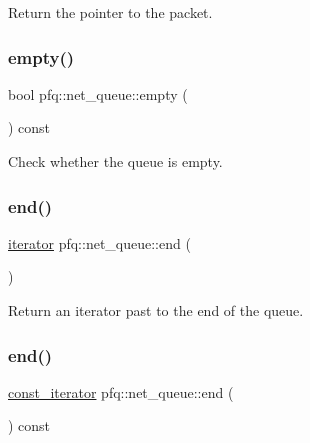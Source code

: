 Return the pointer to the packet. 

\mbox{\label{classpfq_1_1net__queue_a3fa7bba9db8d43916404868573676d25}} 
\subsubsection{\texorpdfstring{empty()}{empty()}}
{\footnotesize\ttfamily bool pfq\+::net\+\_\+queue\+::empty (\begin{DoxyParamCaption}{ }\end{DoxyParamCaption}) const\hspace{0.3cm}{\ttfamily [inline]}}



Check whether the queue is empty. 

\mbox{\label{classpfq_1_1net__queue_acef930aef921f06803621af79f993b25}} 
\subsubsection{\texorpdfstring{end()}{end()}\hspace{0.1cm}{\footnotesize\ttfamily [1/2]}}
{\footnotesize\ttfamily \hyperlink{structpfq_1_1net__queue_1_1iterator}{iterator} pfq\+::net\+\_\+queue\+::end (\begin{DoxyParamCaption}{ }\end{DoxyParamCaption})\hspace{0.3cm}{\ttfamily [inline]}}



Return an iterator past to the end of the queue. 

\mbox{\label{classpfq_1_1net__queue_ad563083d60d2b1b581d52ac2e25e8fff}} 
\subsubsection{\texorpdfstring{end()}{end()}\hspace{0.1cm}{\footnotesize\ttfamily [2/2]}}
{\footnotesize\ttfamily \hyperlink{structpfq_1_1net__queue_1_1const__iterator}{const\+\_\+iterator} pfq\+::net\+\_\+queue\+::end (\begin{DoxyParamCaption}{ }\end{DoxyParamCaption}) const\hspace{0.3cm}{\ttfamily [inline]}}



